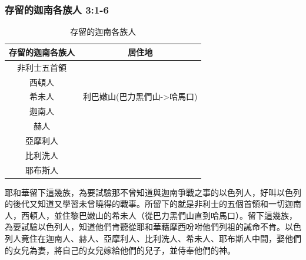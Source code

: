\hspace*{30mm}

\subsubsection{存留的迦南各族人 3:1-6}
\begin{table}
\vspace*{-10mm}
\centering
\begin{tabular}{|c|c|}\hline
存留的迦南各族人                &居住地   \\\hline\hline
非利士五首領 &    \\\hline
西頓人    &  \\\hline
希未人   &  利巴嫩山(巴力黑們山->哈馬口)\\\hline
迦南人&  \\\hline
赫人  & \\\hline
亞摩利人&  \\\hline
比利洗人 &  \\\hline
耶布斯人 & \\\hline
\end{tabular}
\caption{存留的迦南各族人}
\end{table}
耶和華留下這幾族，為要試驗那不曾知道與迦南爭戰之事的以色列人，好叫以色列的後代又知道又學習未曾曉得的戰事。所留下的就是非利士的五個首領和一切迦南人，西頓人，並住黎巴嫩山的希未人（從巴力黑們山直到哈馬口）。留下這幾族，為要試驗以色列人，知道他們肯聽從耶和華藉摩西吩咐他們列祖的誡命不肯。以色列人竟住在迦南人、赫人、亞摩利人、比利洗人、希未人、耶布斯人中間，娶他們的女兒為妻，將自己的女兒嫁給他們的兒子，並侍奉他們的神。


